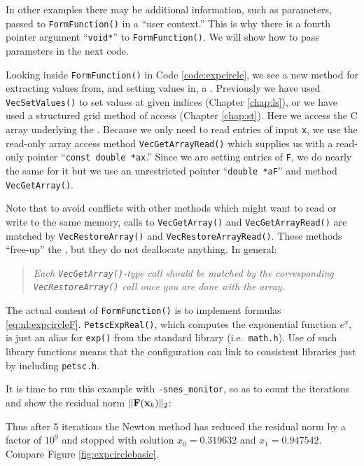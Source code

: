 In other examples there may be additional information, such as parameters, passed to \texttt{FormFunction()} in a ``user context.''  This is why there is a fourth pointer argument ``\texttt{void*}'' to \texttt{FormFunction()}.  We will show how to pass parameters in the next code.

Looking inside \texttt{FormFunction()} in Code \ref{code:expcircle}, we see a new method for extracting values from, and setting values in, a \pVec.  Previously we have used \texttt{VecSetValues()} to set values at given indices (Chapter \ref{chap:ls}), or we have used a \pDMDA structured grid method of access (Chapter \ref{chap:st}).  Here we access the C array underlying the \pVec.  Because we only need to read entries of input \pVec \texttt{x}, we use the read-only array access method \texttt{VecGetArrayRead()} which supplies us with a read-only pointer ``\texttt{const double *ax}.''  Since we are setting entries of \pVec \texttt{F}, we do nearly the same for it but we use an unrestricted pointer ``\texttt{double *aF}'' and method \texttt{VecGetArray()}.

Note that to avoid conflicts with other methods which might want to read or write to the same memory, calls to \texttt{VecGetArray()} and \texttt{VecGetArrayRead()} are matched by \texttt{VecRestoreArray()} and \texttt{VecRestoreArrayRead()}.  These methods ``free-up''  the \pVecs, but they do not deallocate anything.  In general:
\begin{quote}
\emph{Each \emph{\texttt{VecGetArray()}}-type call should be matched by the corresponding \emph{\texttt{VecRestoreArray()}} call once you are done with the array.}
\end{quote}

The actual content of \texttt{FormFunction()} is to implement formulas \eqref{eq:nl:expcircleF}.  \texttt{PetscExpReal()}, which computes the exponential function $e^x$, is just an alias for \texttt{exp()} from the standard library (i.e.~\texttt{math.h}).  Use of such \PETSc library functions means that the \PETSc configuration can link to consistent libraries just by including \texttt{petsc.h}.

It is time to run this example with \texttt{-snes\_monitor}, so as to count the iterations and show the residual norm $\|\mathbf{F}(\mathbf{x}_k)\|_2$:
Thus after 5 iterations the Newton method has reduced the residual norm by a factor of $10^9$ and stopped with solution $x_0=0.319632$ and $x_1=0.947542$.  Compare Figure \ref{fig:expcirclebasic}.

